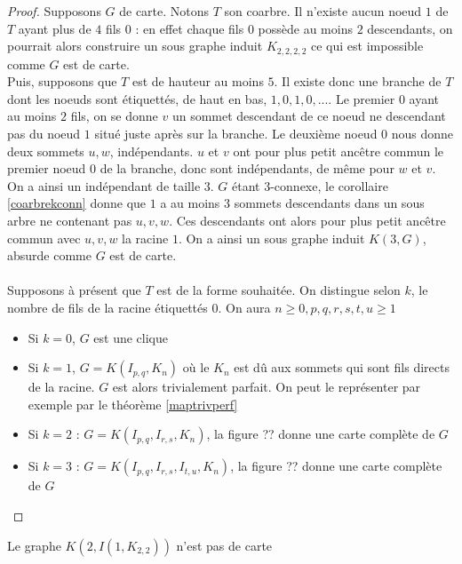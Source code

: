 \documentclass{scrartcl}
\begin{document}
\begin{flushleft}
\begin{proof}
    Supposons $G$ de carte. Notons $T$ son coarbre. Il n'existe aucun noeud $1$ de $T$ ayant plus de $4$ fils $0$ : en effet chaque fils $0$
    possède au moins $2$ descendants, on pourrait alors construire un sous graphe induit $K_{2,2,2,2}$ ce qui est impossible comme $G$ est de carte.\\
    Puis, supposons que $T$ est de hauteur au moins $5$. Il existe donc une branche de $T$ dont les noeuds sont étiquettés, de haut en bas,
    $1, 0, 1, 0, ...$. Le premier $0$ ayant au moins $2$ fils, on se donne $v$ un sommet descendant de ce noeud ne descendant pas
    du noeud $1$ situé juste après sur la branche. Le deuxième noeud $0$ nous donne deux sommets $u, w$, indépendants. $u$ et $v$ ont pour
    plus petit ancêtre commun le premier noeud $0$ de la branche, donc sont indépendants, de même pour $w$ et $v$. On a ainsi un indépendant
    de taille $3$. $G$ étant $3$-connexe, le corollaire \ref{coarbrekconn} donne que $1$ a au moins $3$ sommets descendants dans un sous arbre ne
    contenant pas $u,v,w$. Ces descendants ont alors pour plus petit ancêtre commun avec $u,v,w$ la racine $1$.
    On a ainsi un sous graphe induit $K(3, G)$, absurde comme $G$ est de carte.
    \\~\\
    Supposons à présent que $T$ est de la forme souhaitée. On distingue selon $k$, le nombre de fils de la racine étiquettés $0$.
    On aura $n \geq 0, p,q,r,s,t,u \geq 1$
    \begin{itemize}
        \item Si $k = 0$, $G$ est une clique
        \item Si $k = 1$, $G = K(I_{p,q}, K_n)$ où le $K_n$ est dû aux sommets qui sont fils directs de la racine.
        $G$ est alors trivialement parfait. On peut le représenter par exemple par le théorème \ref{maptrivperf}
        \item Si $k = 2$ : $G = K(I_{p,q}, I_{r,s}, K_n)$, la figure ?? donne une carte complète de $G$
        \item Si $k = 3$ : $G = K(I_{p,q}, I_{r,s}, I_{t,u}, K_n)$, la figure ?? donne une carte complète de $G$
    \end{itemize}
\end{proof}

\begin{lem}
    Le graphe $K(2, I(1, K_{2,2}))$ n'est pas de carte
\end{lem}


\end{flushleft}
\end{document}
